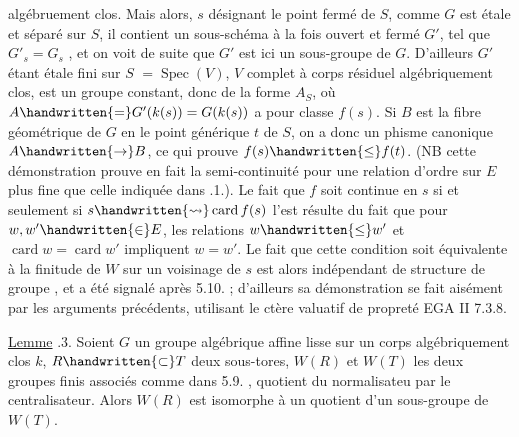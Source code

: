 algébruement clos. Mais alors, $s$ désignant le point fermé de $S$, comme $G$ est étale et séparé sur $S$, il contient un sous-schéma à la fois ouvert et fermé $G'$,  tel que $G'_s=G_s$ , et on voit de suite que $G'$ est ici un sous-groupe de $G$.  D'ailleurs $G'$  étant étale fini sur $S$  $=\operatorname{Spec}(V)$, $V$ complet à corps résiduel algébriquement clos, est un groupe constant, donc de la forme $A_S$, où $A\handwritten{=}G'(k(s))=G(k(s))$ a pour classe $f(s)$.  Si $B$ est la fibre géométrique de $G$ en le point générique $t$ de $S$, on a donc un phisme canonique $A\handwritten{\to}B$, ce qui prouve $f(s)\handwritten{\leq} f(t)$. (NB cette démonstration prouve en fait la semi-continuité pour une relation d'ordre sur $E$ plus fine que celle indiquée dans .1.). Le fait que $f$ soit continue en $s$ si et seulement si $s\handwritten{\rightsquigarrow}\operatorname{card} f(s)$ l'est résulte du fait que pour $w,w'\handwritten{\in}E$, les relations  $w\handwritten{\leq}w'$ et $\operatorname{card} w=\operatorname{card} w'$ impliquent $w=w'$. Le fait que cette condition soit équivalente à la finitude de $W$ sur un voisinage de $s$ est alors indépendant de  structure de groupe , et a été signalé après  5.10. ; d'ailleurs sa démonstration  se fait aisément par les arguments précédents,  utilisant le ctère valuatif de propreté EGA II 7.3.8.

\uline{Lemme} .3. Soient $G$ un groupe algébrique affine lisse sur un corps algébriquement clos $k$, $R\handwritten{\subset}T$ deux sous-tores, $W(R)$ et $W(T)$ les deux groupes finis associés comme dans  5.9. , quotient du normalisateu par le centralisateur. Alors $W(R)$ est isomorphe à un quotient d'un sous-groupe de $W(T)$.

